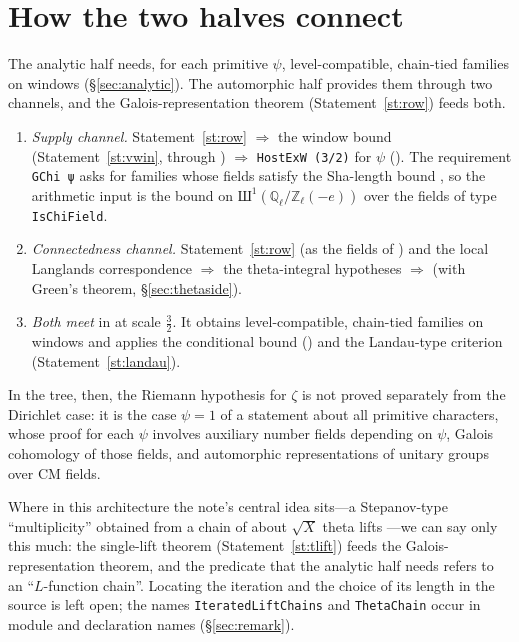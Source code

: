 \section{How the two halves connect}\label{sec:connection}

The analytic half needs, for each primitive $\psi$, level-compatible, chain-tied families on windows
(\S\ref{sec:analytic}). The automorphic half provides them through two channels, and the
Galois-representation theorem (Statement~\ref{st:row}) feeds both.

\begin{enumerate}
\item \emph{Supply channel.} Statement~\ref{st:row} $\Rightarrow$ the window bound
  (Statement~\ref{st:vwin}, through ) $\Rightarrow$
  \texttt{HostExW (3/2)} for  $\psi$ ().
  The requirement \texttt{GChi ψ} asks for families whose fields satisfy the Sha-length bound
  , so the arithmetic input is the bound on
  $\text{Ш}^1(\mathbb Q_\ell/\mathbb Z_\ell(-e))$ over the fields of type \texttt{IsChiField}.
\item \emph{Connectedness channel.} Statement~\ref{st:row} (as the fields of
  ) and the local Langlands
  correspondence $\Rightarrow$ the theta-integral hypotheses $\Rightarrow$
   (with Green's theorem, \S\ref{sec:thetaside}).
\item \emph{Both meet} in  at scale $\frac32$. It
  obtains level-compatible, chain-tied families on windows and applies the conditional bound
  () and the Landau-type criterion
  (Statement~\ref{st:landau}).
\end{enumerate}

\noindent In the tree, then, the Riemann hypothesis for $\zeta$ is not proved separately from the
Dirichlet case: it is the case $\psi=1$ of a statement about all primitive characters, whose proof
for each $\psi$ involves auxiliary number fields depending on $\psi$, Galois cohomology of those
fields, and automorphic representations of unitary groups over CM fields.

Where in this architecture the note's central idea sits---a Stepanov-type ``multiplicity'' obtained
from a chain of about $\sqrt X$ theta lifts ---we can say only this much: the single-lift
theorem (Statement~\ref{st:tlift}) feeds the Galois-representation theorem, and the predicate
 that the analytic half needs refers to an ``$L$-function
chain''. Locating the iteration and the choice of its length in the source is left open; the names
\texttt{IteratedLiftChains} and \texttt{ThetaChain} occur in module and declaration names
(\S\ref{sec:remark}).
